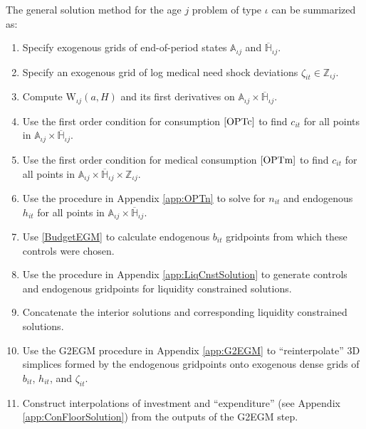 \documentclass[12pt,pdftex,letterpaper]{article}
\newcommand{\Type}{\iota}
\newcommand{\Health}{h}
\newcommand{\PostHealth}{H}
\newcommand{\PostValue}{\text{W}}
\newcommand{\Con}{c}
\newcommand{\Invst}{n}
\newcommand{\Bank}{b}
\newcommand{\Assets}{a}
\newcommand{\Age}{j}
\begin{document}
The general solution method for the age $\Age$ problem of type $\Type$ can be summarized as:
\begin{enumerate}
\item Specify exogenous grids of end-of-period states $\mathbb{A}_{\Type \Age}$ and $\overline{\mathbb{H}}_{\Type \Age}$.

\item Specify an exogenous grid of log medical need shock deviations $\zeta_{it} \in \mathbb{Z}_{\Type \Age}$.

\item Compute $\PostValue_{\Type \Age}(\Assets,\PostHealth)$ and its first derivatives on $\mathbb{A}_{\Type \Age} \times \overline{\mathbb{H}}_{\Type \Age}$.

\item Use the first order condition for consumption $\eqref{OPTc}$ to find $\Con_{it}$ for all points in $\mathbb{A}_{\Type \Age} \times \overline{\mathbb{H}}_{\Type \Age}$.

\item Use the first order condition for medical consumption $\eqref{OPTm}$ to find $\Con_{it}$ for all points in $\mathbb{A}_{\Type \Age} \times \overline{\mathbb{H}}_{\Type \Age} \times \mathbb{Z}_{\Type \Age}$.

\item Use the procedure in Appendix \ref{app:OPTn} to solve for $\Invst_{it}$ and endogenous $\Health_{it}$ for all points in $\mathbb{A}_{\Type \Age} \times \overline{\mathbb{H}}_{\Type \Age}$.

\item Use \eqref{BudgetEGM} to calculate endogenous $\Bank_{it}$ gridpoints from which these controls were chosen.

\item Use the procedure in Appendix \ref{app:LiqCnstSolution} to generate controls and endogenous gridpoints for liquidity constrained solutions.

\item Concatenate the interior solutions and corresponding liquidity constrained solutions.

\item Use the G2EGM procedure in Appendix \ref{app:G2EGM} to ``reinterpolate'' 3D simplices formed by the endogenous gridpoints onto exogenous dense grids of $\Bank_{it}$, $\Health_{it}$, and $\zeta_{it}$.

\item Construct interpolations of investment and ``expenditure'' (see Appendix \ref{app:ConFloorSolution}) from the outputs of the G2EGM step.


\end{enumerate}
\end{document}
